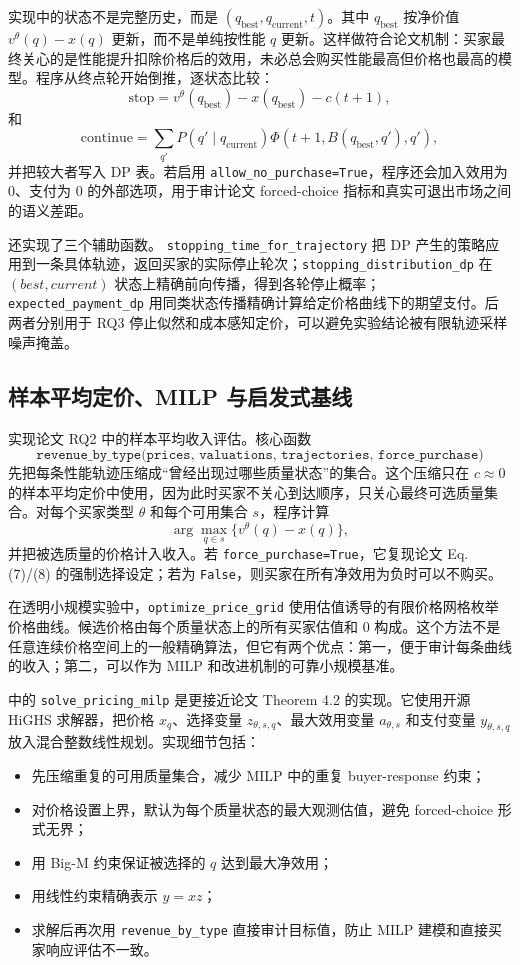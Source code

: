 \documentclass[11pt,a4paper]{ctexart}
\theoremstyle{definition}
\begin{document}
实现中的状态不是完整历史，而是 $(q_{\mathrm{best}},q_{\mathrm{current}},t)$。其中 $q_{\mathrm{best}}$ 按净价值 $v^\theta(q)-x(q)$ 更新，而不是单纯按性能 $q$ 更新。这样做符合论文机制：买家最终关心的是性能提升扣除价格后的效用，未必总会购买性能最高但价格也最高的模型。程序从终点轮开始倒推，逐状态比较：
\[
\text{stop}=v^\theta(q_{\mathrm{best}})-x(q_{\mathrm{best}})-c(t+1),
\]
和
\[
\text{continue}=\sum_{q'}P(q'\mid q_{\mathrm{current}})
\Phi(t+1,B(q_{\mathrm{best}},q'),q'),
\]
并把较大者写入 DP 表。若启用 \texttt{allow\_no\_purchase=True}，程序还会加入效用为 0、支付为 0 的外部选项，用于审计论文 forced-choice 指标和真实可退出市场之间的语义差距。

 还实现了三个辅助函数。 \texttt{stopping\_time\_for\_trajectory} 把 DP 产生的策略应用到一条具体轨迹，返回买家的实际停止轮次；\texttt{stopping\_distribution\_dp} 在 $(best,current)$ 状态上精确前向传播，得到各轮停止概率；\texttt{expected\_payment\_dp} 用同类状态传播精确计算给定价格曲线下的期望支付。后两者分别用于 RQ3 停止似然和成本感知定价，可以避免实验结论被有限轨迹采样噪声掩盖。

\subsection{样本平均定价、MILP 与启发式基线}

 实现论文 RQ2 中的样本平均收入评估。核心函数
\[
\texttt{revenue\_by\_type(prices, valuations, trajectories, force\_purchase)}
\]
先把每条性能轨迹压缩成“曾经出现过哪些质量状态”的集合。这个压缩只在 $c\approx0$ 的样本平均定价中使用，因为此时买家不关心到达顺序，只关心最终可选质量集合。对每个买家类型 $\theta$ 和每个可用集合 $s$，程序计算
\[
\arg\max_{q\in s}\{v^\theta(q)-x(q)\},
\]
并把被选质量的价格计入收入。若 \texttt{force\_purchase=True}，它复现论文 Eq. (7)/(8) 的强制选择设定；若为 \texttt{False}，则买家在所有净效用为负时可以不购买。

在透明小规模实验中，\texttt{optimize\_price\_grid} 使用估值诱导的有限价格网格枚举价格曲线。候选价格由每个质量状态上的所有买家估值和 0 构成。这个方法不是任意连续价格空间上的一般精确算法，但它有两个优点：第一，便于审计每条曲线的收入；第二，可以作为 MILP 和改进机制的可靠小规模基准。

 中的 \texttt{solve\_pricing\_milp} 是更接近论文 Theorem 4.2 的实现。它使用开源 HiGHS 求解器，把价格 $x_q$、选择变量 $z_{\theta,s,q}$、最大效用变量 $a_{\theta,s}$ 和支付变量 $y_{\theta,s,q}$ 放入混合整数线性规划。实现细节包括：
\begin{itemize}
\item 先压缩重复的可用质量集合，减少 MILP 中的重复 buyer-response 约束；
\item 对价格设置上界，默认为每个质量状态的最大观测估值，避免 forced-choice 形式无界；
\item 用 Big-M 约束保证被选择的 $q$ 达到最大净效用；
\item 用线性约束精确表示 $y=xz$；
\item 求解后再次用 \texttt{revenue\_by\_type} 直接审计目标值，防止 MILP 建模和直接买家响应评估不一致。
\end{itemize}
\end{document}
